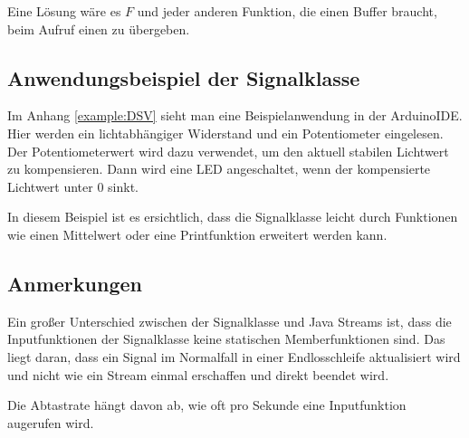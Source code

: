 Eine Lösung wäre es $F$ und jeder anderen Funktion, die einen Buffer braucht,
beim Aufruf einen zu übergeben. 

\subsection{Anwendungsbeispiel der Signalklasse}
Im Anhang \ref{example:DSV} sieht man eine Beispielanwendung in der ArduinoIDE. 
Hier werden ein
lichtabhängiger Widerstand und ein Potentiometer eingelesen. Der Potentiometerwert
wird dazu verwendet, um den aktuell stabilen Lichtwert zu kompensieren. Dann wird
eine LED angeschaltet, wenn der kompensierte Lichtwert unter 0 sinkt.

In diesem Beispiel ist es ersichtlich, dass die Signalklasse 
leicht durch Funktionen wie einen Mittelwert oder eine Printfunktion erweitert
werden kann.

\subsection{Anmerkungen}
Ein großer Unterschied zwischen der Signalklasse und Java Streams ist, dass 
die Inputfunktionen der Signalklasse keine statischen Memberfunktionen sind.
Das liegt daran, dass ein Signal im Normalfall in einer Endlosschleife 
aktualisiert wird und nicht wie ein Stream einmal erschaffen und direkt 
beendet wird. 

Die Abtastrate hängt davon ab, wie oft pro Sekunde eine Inputfunktion
augerufen wird.

